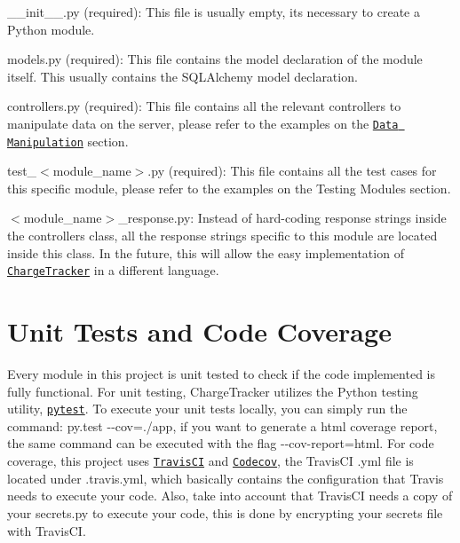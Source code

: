 \begin{DoxyItemize}
\item {\ttfamily \+\_\+\+\_\+init\+\_\+\+\_\+.\+py} (required)\+: This file is usually empty, its necessary to create a Python module.
\item {\ttfamily models.\+py} (required)\+: This file contains the model declaration of the module itself. This usually contains the S\+Q\+L\+Alchemy model declaration.
\item {\ttfamily controllers.\+py} (required)\+: This file contains all the relevant controllers to manipulate data on the server, please refer to the examples on the \href{#datamani}{\tt Data Manipulation} section.
\item {\ttfamily test\+\_\+$<$module\+\_\+name$>$.py} (required)\+: This file contains all the test cases for this specific module, please refer to the examples on the Testing Modules section.
\item {\ttfamily $<$module\+\_\+name$>$\+\_\+response.\+py}\+: Instead of hard-\/coding response strings inside the controllers class, all the response strings specific to this module are located inside this class. In the future, this will allow the easy implementation of \href{https://github.com/ritstudentgovernment/chargeflask}{\tt Charge\+Tracker} in a different language.
\end{DoxyItemize}\hypertarget{index_unittests}{}\section{Unit Tests and Code Coverage}\label{index_unittests}
Every module in this project is unit tested to check if the code implemented is fully functional. For unit testing, Charge\+Tracker utilizes the Python testing utility, \href{https://docs.pytest.org}{\tt pytest}. To execute your unit tests locally, you can simply run the command\+: {\ttfamily py.\+test -\/-\/cov=./app}, if you want to generate a html coverage report, the same command can be executed with the flag {\ttfamily -\/-\/cov-\/report=html}. For code coverage, this project uses \href{https://travis-ci.org/}{\tt Travis\+CI} and \href{https://codecov.io/gh}{\tt Codecov}, the Travis\+CI .yml file is located under {\ttfamily .travis.\+yml}, which basically contains the configuration that Travis needs to execute your code. Also, take into account that Travis\+CI needs a copy of your {\ttfamily secrets.\+py} to execute your code, this is done by encrypting your secrets file with Travis\+CI. 